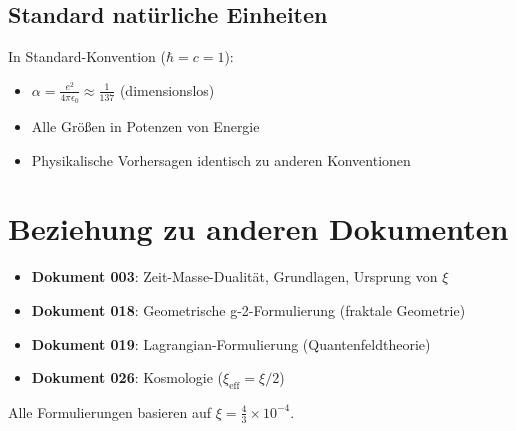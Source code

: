 	\subsection{Standard natürliche Einheiten}
	
	In Standard-Konvention ($\hbar = c = 1$):
	\begin{itemize}
		\item $\alpha = \frac{e^2}{4\pi\epsilon_0} \approx \frac{1}{137}$ (dimensionslos)
		\item Alle Größen in Potenzen von Energie
		\item Physikalische Vorhersagen identisch zu anderen Konventionen
	\end{itemize}
	
	\section{Beziehung zu anderen Dokumenten}
	
	\begin{itemize}
		\item \textbf{Dokument 003}: Zeit-Masse-Dualität, Grundlagen, Ursprung von $\xi$
		\item \textbf{Dokument 018}: Geometrische g-2-Formulierung (fraktale Geometrie)
		\item \textbf{Dokument 019}: Lagrangian-Formulierung (Quantenfeldtheorie)
		\item \textbf{Dokument 026}: Kosmologie ($\xi_{\text{eff}} = \xi/2$)
	\end{itemize}
	
	Alle Formulierungen basieren auf $\xi = \frac{4}{3} \times 10^{-4}$.
	